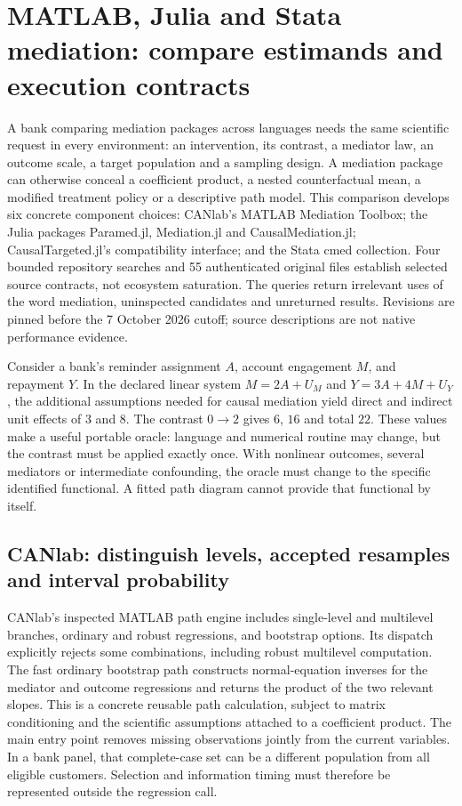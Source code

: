 \section[Remaining-language mediation contracts]{MATLAB, Julia and Stata mediation: compare estimands and execution contracts}
\label{sec:exec25-omed}

A bank comparing mediation packages across languages needs the same scientific
request in every environment: an intervention, its contrast, a mediator law,
an outcome scale, a target population and a sampling design. A mediation
package can otherwise conceal a coefficient product, a nested counterfactual
mean, a modified treatment policy or a descriptive path model. This comparison
develops six concrete component choices: CANlab's MATLAB Mediation Toolbox;
the Julia packages Paramed.jl, Mediation.jl and CausalMediation.jl;
CausalTargeted.jl's compatibility interface; and the Stata cmed collection.
Four bounded repository searches and 55 authenticated original files establish
selected source contracts, not ecosystem saturation. The queries return
irrelevant uses of the word mediation, uninspected candidates and unreturned
results. Revisions are pinned before the 7 October 2026 cutoff; source
descriptions are not native performance evidence.~\citep{exec25_omed_choice}

Consider a bank's reminder assignment $A$, account engagement $M$, and repayment
$Y$. In the declared linear system $M=2A+U_M$ and $Y=3A+4M+U_Y$, the additional
assumptions needed for causal mediation yield direct and indirect unit effects
of $3$ and $8$. The contrast $0\rightarrow2$ gives $6$, $16$ and total $22$.
These values make a useful portable oracle: language and numerical routine may
change, but the contrast must be applied exactly once. With nonlinear outcomes,
several mediators or intermediate confounding, the oracle must change to the
specific identified functional. A fitted path diagram cannot provide that
functional by itself.~\citep{exec25_omed_choice}

\subsection{CANlab: distinguish levels, accepted resamples and interval probability}

CANlab's inspected MATLAB path engine includes single-level and multilevel
branches, ordinary and robust regressions, and bootstrap options. Its dispatch
explicitly rejects some combinations, including robust multilevel computation.
The fast ordinary bootstrap path constructs normal-equation inverses for the
mediator and outcome regressions and returns the product of the two relevant
slopes. This is a concrete reusable path calculation, subject to matrix
conditioning and the scientific assumptions attached to a coefficient product.
The main entry point removes missing observations jointly from the current
variables. In a bank panel, that complete-case set can be a different population
from all eligible customers. Selection and information timing must therefore
be represented outside the regression call.~\citep{exec25_omed_canlab}

